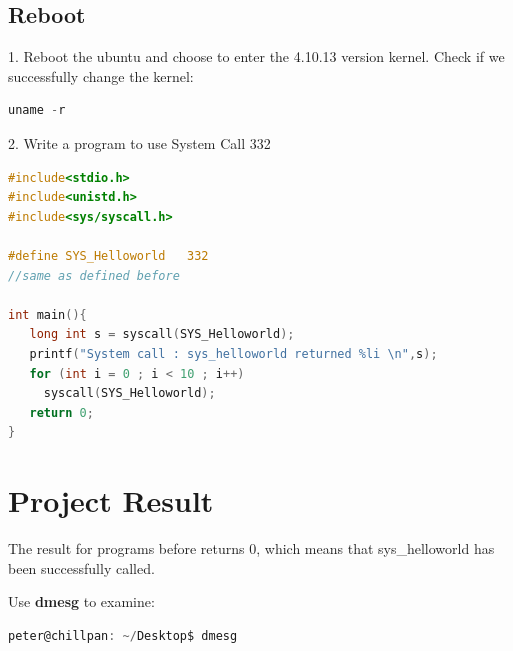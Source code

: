 \documentclass[12pt,a4paper]{article}
\begin{document}
\subsection{Reboot}
1. Reboot the ubuntu and choose to enter the 4.10.13 version kernel. Check if we successfully change the kernel:

\begin{lstlisting}[language = C]
   uname -r
\end{lstlisting}

2. Write a program to use System Call 332

\begin{lstlisting}[language = C]
#include<stdio.h>
#include<unistd.h>
#include<sys/syscall.h>

#define SYS_Helloworld   332  
//same as defined before

int main(){
   long int s = syscall(SYS_Helloworld);
   printf("System call : sys_helloworld returned %li \n",s);
   for (int i = 0 ; i < 10 ; i++)
     syscall(SYS_Helloworld);
   return 0;
}

\end{lstlisting}

\section{Project Result}

The result for programs before returns 0, which means that sys\_helloworld has been successfully called.

Use \textbf{dmesg} to examine:

\begin{lstlisting}[language = C]
  peter@chillpan: ~/Desktop$ dmesg
\end{lstlisting}
\end{document}
